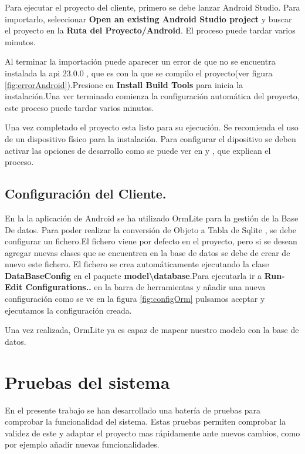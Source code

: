 Para ejecutar el proyecto del cliente, primero se debe lanzar Android Studio. Para importarlo, seleccionar \textbf{Open an existing Android Studio project} y buscar el proyecto en la \textbf{Ruta del Proyecto/Android}. El proceso puede tardar varios minutos.

Al terminar la importación puede aparecer un error de que no se encuentra instalada la api 23.0.0 , que es con la que se compilo el proyecto(ver figura \ref{fig:errorAndroid}).Presione en \textbf{Install Build Tools} para inicia la instalación.Una ver terminado comienza la configuración automática del proyecto, este proceso puede tardar varios minutos.

Una vez completado el proyecto esta listo para su ejecución. Se recomienda el uso de un dispositivo físico para la instalación. Para configurar el dipositivo se deben activar las opciones de desarrollo como se puede ver en \cite{debug} y \cite{depuracion}, que explican el proceso.

\subsection{Configuración del Cliente.}

En la la aplicación de Android se ha utilizado OrmLite para la gestión de la Base De datos. Para poder realizar la conversión de Objeto a Tabla de Sqlite , se debe configurar un fichero.El fichero viene por defecto en el proyecto, pero si se desean agregar nuevas clases que se encuentren en la base de datos se debe de crear de nuevo este fichero.
El fichero se crea automáticamente ejecutando la clase \textbf{DataBaseConfig} en el paquete \textbf{model\textbackslash database}.Para ejecutarla ir a \textbf{Run-Edit Configurations..} en la barra de herramientas y añadir una nueva configuración como se ve en la figura \ref{fig:configOrm} pulsamos aceptar y ejecutamos la configuración creada.


Una vez realizada, OrmLite ya es capaz de mapear nuestro modelo con la base de datos.

\section{Pruebas del sistema}

En el presente trabajo se han desarrollado una batería de pruebas para comprobar la funcionalidad del sistema. Estas pruebas permiten comprobar la validez de este y adaptar el proyecto mas rápidamente  ante nuevos cambios, como por ejemplo añadir nuevas funcionalidades.

